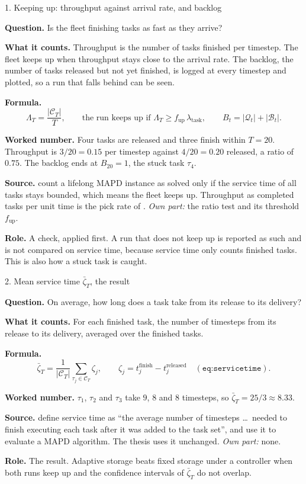 \documentclass[11pt,a4paper]{article}
\newcommand{\row}[1]{\par\smallskip\noindent\textbf{#1}\enspace}
\begin{document}
\begin{card}{1. Keeping up: throughput against arrival rate, and backlog}
\row{Question.} Is the fleet finishing tasks as fast as they arrive?

\row{What it counts.} Throughput is the number of tasks finished per
timestep. The fleet keeps up when throughput stays close to the arrival
rate. The backlog, the number of tasks released but not yet finished, is
logged at every timestep and plotted, so a run that falls behind can be
seen.

\row{Formula.}
\[
  \Lambda_T = \frac{|\mathcal{C}_T|}{T}, \qquad
  \text{the run keeps up if } \Lambda_T \ge f_{\mathrm{up}}\,\lambda_{\mathrm{task}},
  \qquad B_t = |\mathcal{Q}_t| + |\mathcal{B}_t| .
\]

\row{Worked number.} Four tasks are released and three finish within
$T = 20$. Throughput is $3/20 = 0.15$ per timestep against $4/20 = 0.20$
released, a ratio of $0.75$. The backlog ends at $B_{20} = 1$, the stuck
task $\tau_4$.

\row{Source.} \citet{ma2017lifelong_mapf} count a lifelong MAPD instance as
solved only if the service time of all tasks stays bounded, which means
the fleet keeps up. Throughput as completed tasks per unit time is the pick
rate of \citet{krnjaic2022warehouse_marl}. \emph{Own part:} the ratio test
and its threshold $f_{\mathrm{up}}$.

\row{Role.} A check, applied first. A run that does not keep up is
reported as such and is not compared on service time, because service time
only counts finished tasks. This is also how a stuck task is caught.
\end{card}

\begin{card}{2. Mean service time $\bar\zeta_T$, the result}
\row{Question.} On average, how long does a task take from its release to
its delivery?

\row{What it counts.} For each finished task, the number of timesteps from
its release to its delivery, averaged over the finished tasks.

\row{Formula.}
\[
  \bar\zeta_T = \frac{1}{|\mathcal{C}_T|}\sum_{\tau_j\in\mathcal{C}_T}\zeta_j,
  \qquad \zeta_j = t_j^{\mathrm{finish}} - t_j^{\mathrm{released}}
  \quad (\texttt{eq:servicetime}).
\]

\row{Worked number.} $\tau_1$, $\tau_2$ and $\tau_3$ take $9$, $8$ and $8$
timesteps, so $\bar\zeta_T = 25/3 \approx 8.33$.

\row{Source.} \citet{ma2017lifelong_mapf} define service time as ``the
average number of timesteps \ldots\ needed to finish executing each task
after it was added to the task set'', and use it to evaluate a MAPD
algorithm. The thesis uses it unchanged. \emph{Own part:} none.

\row{Role.} The result. Adaptive storage beats fixed storage under a
controller when both runs keep up and the confidence intervals of
$\bar\zeta_T$ do not overlap.
\end{card}
\end{document}

